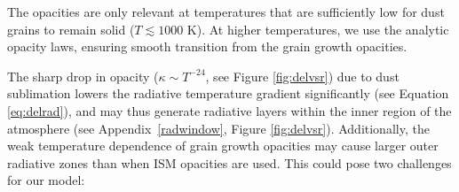\documentclass[apj]{emulateapj}
\newcommand{\App}[1]{Appendix~\ref{#1}}
\begin{document}
The \citet{dalessio01} opacities are only relevant at temperatures that are sufficiently low for dust grains to remain solid ($T \lesssim 1000$ K). At higher temperatures, we use the \citet{bell94} analytic opacity laws, ensuring smooth transition from the grain growth opacities. 

The sharp drop in opacity ($\kappa \sim T^{-24}$, see Figure \ref{fig:delvsr}) due to dust sublimation lowers the radiative temperature gradient significantly (see Equation \ref{eq:delrad}), and may thus generate radiative layers within the inner region of the atmosphere (see \App{radwindow}, Figure \ref{fig:delvsr}). Additionally, the weak temperature dependence of grain growth opacities may cause larger outer radiative zones than when ISM opacities are used. This could pose two challenges for our model:
\end{document}

